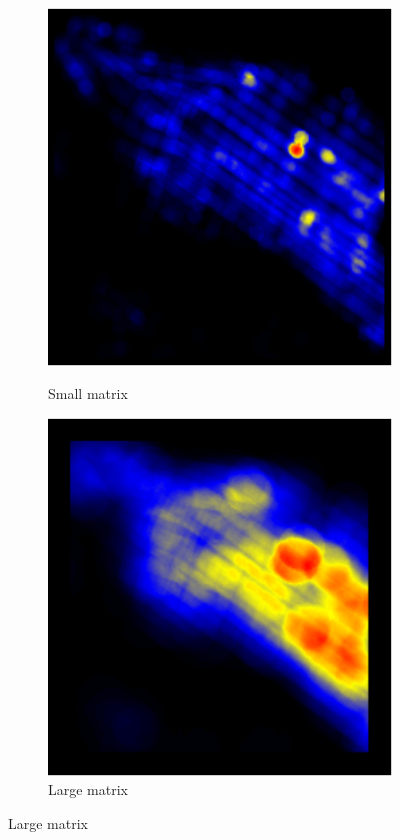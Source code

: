 \documentclass{itatnew}
\begin{document}
%
%
\begin{figure}[htp]
  \centering
  \begin{subfigure}{.3\linewidth}
    \caption{Small matrix}
    \includegraphics[width=\linewidth]{images/gen-raw-blur-gstar-2}
    \label{fig:BlurExample:a}
  \end{subfigure}
  \begin{subfigure}{.3\linewidth}
    \caption{Large matrix}
    \includegraphics[width=\linewidth]{images/gen-raw-blur-gstar-8}

\end{subfigure}
\end{figure}
\end{document}
